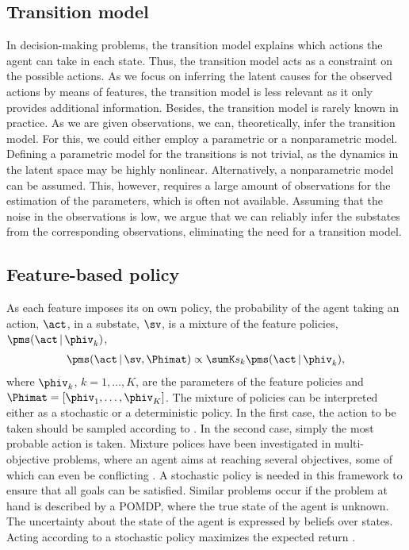 \documentclass{article}
\begin{document}
\subsection{Transition model}
In decision-making problems, the transition model explains which actions the agent can take in each state.
Thus, the transition model acts as a constraint on the possible actions. 
As we focus on inferring the latent causes for the observed actions by means of features, the transition model is less relevant as it only provides additional information.
Besides, the transition model is rarely known in practice.
As we are given observations, we can, theoretically, infer the transition model. For this, we could either employ a parametric or a nonparametric model. 
Defining a parametric model for the transitions is not trivial, as the dynamics in the latent space may be highly nonlinear.
Alternatively, a nonparametric model can be assumed. This, however, requires a large amount of observations for the estimation of the parameters, which is often not available.
Assuming that the noise in the observations is low, we argue that we can reliably infer the substates from the corresponding observations, eliminating the need for a transition model.


\subsection{Feature-based policy}
\label{sec::intro::policy}
As each feature imposes its on own policy, the probability of the agent taking an action, $\act$, in a substate, $\sv$, is a mixture of the feature policies, $\pms( \act \,|\, \phiv_k)$,
\begin{align}
   \pms( \act \,|\, \sv, \Phimat) \propto \sumK s_k \pms( \act \,|\, \phiv_k), 
   \label{eq::dm::policy::model}
\end{align} 
where $\phiv_k$, $k=1,\ldots,K$, are the parameters of the feature policies and $\Phimat = [\phiv_1,\ldots,\phiv_K]$.
The mixture of policies  can be interpreted either as a stochastic or a deterministic policy. 
In the first case, the action to be taken should be sampled according to .
In the second case, simply the most probable action is taken.
Mixture polices have been investigated in multi-objective problems, where an agent aims at reaching several objectives, some of which can even be conflicting \cite{Parisi2014,Vamplew2009,Shelton2001}. 
A stochastic policy is needed in this framework to ensure that all goals can be satisfied.
Similar problems occur if the problem at hand is described by a \ac{POMDP}, where the true state of the agent is unknown. 
The uncertainty about the state of the agent is expressed by beliefs over states. 
Acting according to a stochastic policy maximizes the expected return \cite{Kaelbling1998}.  
\end{document}
